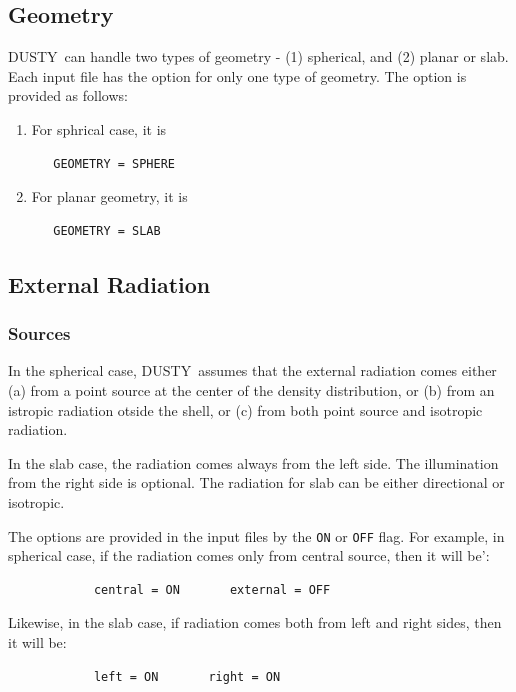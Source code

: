\documentclass[11pt]{article}
\def\D  {{\sf DUSTY}}
\begin{document}
\subsection{Geometry}
\label{geometry}

\D\ can handle two types of geometry - (1) spherical, and (2) planar or slab.
Each input file has the option for only one type of geometry. The option is
provided as follows:
%
\begin{enumerate}
%
\item For sphrical case, it is
\begin{verbatim}
   GEOMETRY = SPHERE
\end{verbatim}
%
\item For planar geometry, it is
\begin{verbatim}
   GEOMETRY = SLAB
\end{verbatim}
%
\end{enumerate}

\subsection{External Radiation}
\label{phy_parameters}

\subsubsection{Sources}
\label{sources}

In the spherical case, \D\ assumes that the external radiation comes either (a)
from a point source at the center of the density distribution, or (b) from an
istropic radiation otside the shell, or (c) from both point source and
isotropic radiation.

In the slab case, the radiation comes always from the left side. The
illumination from the right side is optional. The radiation for slab can be
either directional or isotropic.

The options are provided in the input files by the {\tt ON} or {\tt OFF} flag.
For example, in spherical case, if the radiation comes only from central
source, then it will be':
%
\begin{verbatim}
            central = ON       external = OFF
\end{verbatim}

Likewise, in the slab case, if radiation comes both from left and right sides,
then it will be:
%
\begin{verbatim}
            left = ON       right = ON
\end{verbatim}
%
\end{document}
